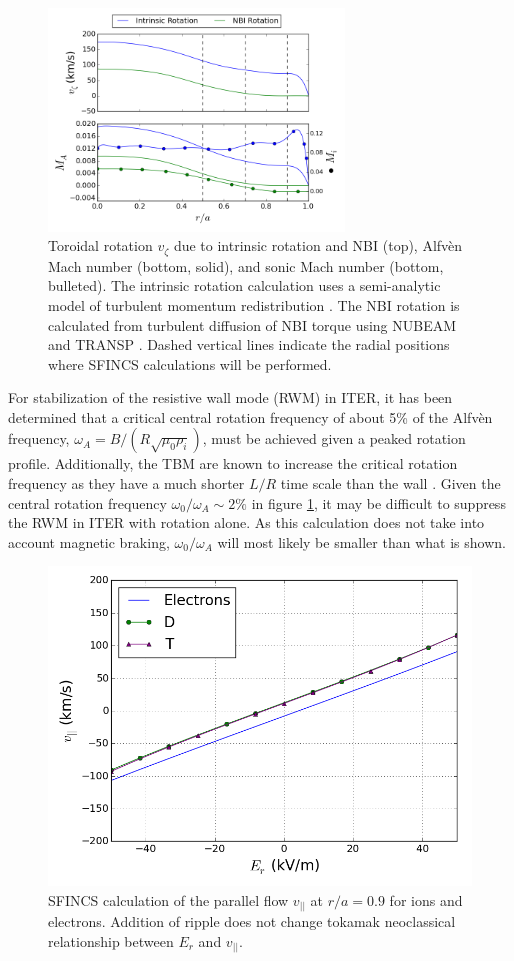 \documentclass{article}
\begin{document}
\begin{figure}[h!]
\centering
\includegraphics[width=0.7\textwidth]{rotationestimate.png}
\caption{\label{fig:rotation_estimate} Toroidal rotation $v_{\zeta}$ due to intrinsic rotation and NBI (top), Alfv\`{e}n Mach number  (bottom, solid), and sonic Mach number (bottom, bulleted). The intrinsic rotation calculation uses a semi-analytic model of turbulent momentum redistribution \cite{Hillesheim2015}. The NBI rotation is calculated from turbulent diffusion of NBI torque using NUBEAM and TRANSP \cite{Poli2014}. Dashed vertical lines indicate the radial positions where SFINCS calculations will be performed. }
\end{figure}

For stabilization of the resistive wall mode (RWM) in ITER, it has been determined that a critical central rotation frequency of about 5\% of the Alfv\`{e}n frequency, $\omega_A = B/(R\sqrt{\mu_0 \rho_i})$, must be achieved given a peaked rotation profile. Additionally, the TBM are known to increase the critical rotation frequency as they have a much shorter $L/R$ time scale than the wall \cite{Liu2004}. Given the central rotation frequency $\omega_0/\omega_A \sim 2\%$ in figure \ref{fig:rotation_estimate}, it may be difficult to suppress the RWM in ITER with rotation alone. As this calculation does not take into account magnetic braking, $\omega_0/\omega_A$ will most likely be smaller than what is shown. 

\begin{figure}[h!]
\centering
\includegraphics[width=.7\textwidth]{Er_flow.png}
\caption{\label{fig:Er_flow} SFINCS calculation of the parallel flow $v_{||}$ at $r/a = 0.9$ for ions and electrons. Addition of ripple does not change tokamak neoclassical relationship between $E_r$ and $v_{||}$. }
\end{figure}
\end{document}
